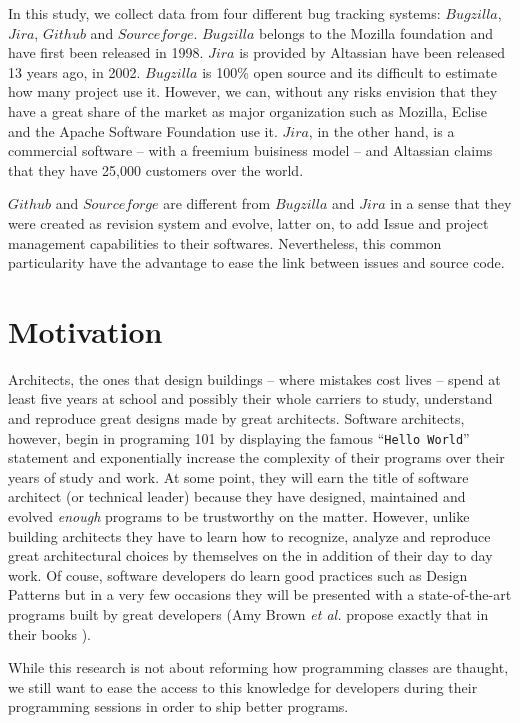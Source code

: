  In this study, we collect data from four different bug tracking systems: $Bugzilla$, $Jira$, $Github$ and $Sourceforge$. $Bugzilla$ belongs to the Mozilla foundation and have first been released in 1998. $Jira$ is provided by Altassian have been released 13 years ago, in 2002. $Bugzilla$ is 100\% open source and its difficult to estimate how many project use it.
 However, we can, without any risks envision that they have a great share of the market as major organization such as Mozilla, Eclise and the Apache Software Foundation use it.
 $Jira$, in the other hand, is a commercial software -- with a freemium buisiness model -- and Altassian claims that they have 25,000 customers over the world.

 $Github$ and $Sourceforge$ are different from $Bugzilla$ and $Jira$ in a sense that they were created as revision system and evolve, latter on, to add Issue and project management capabilities to their softwares. Nevertheless, this common particularity have the advantage to ease the link between issues and source code.



\section{Motivation}

Architects, the ones that design buildings -- where mistakes cost lives -- spend at least five years at school and possibly their whole carriers to study, understand and reproduce great designs made by great architects.
Software architects, however, begin in programing 101 by displaying the famous ``{\tt Hello World}'' statement and exponentially increase the complexity of their programs over their years of study and work.
At some point, they will earn the title of software architect (or technical leader) because they have designed, maintained and evolved {\it enough} programs to be trustworthy on the matter.
However, unlike building architects they have to learn how to recognize, analyze and reproduce great architectural choices by themselves on the in addition of their day to day work.
Of couse, software developers do learn good practices such as Design Patterns \cite{Gamma2008} but in a very few occasions they will be presented with a state-of-the-art programs built by great developers (Amy Brown {\it et al.} propose exactly that in their books \cite{chansler2011architecture, AmyBrown2012,Armstrong2013}).

While this research is not about reforming how programming classes are thaught, we still want to ease the access to this knowledge for developers during their programming sessions in order to ship better programs.


